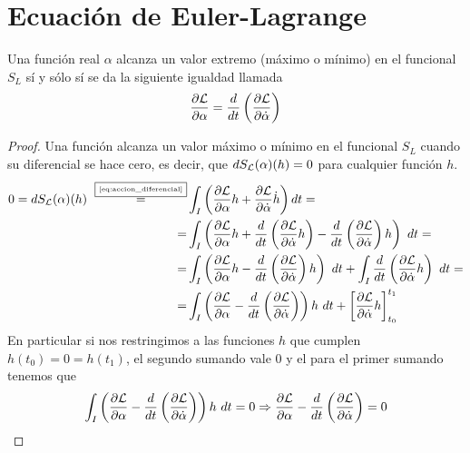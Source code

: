 \section{Ecuación de Euler-Lagrange}\label{sec:ecuacion-de-euler-lagrange}

\begin{theorem}
	Una función real $\alpha$ alcanza un valor extremo (máximo o mínimo) en el funcional $S_L$ sí y sólo sí se da la siguiente igualdad llamada 
	\begin{equation}
		\label{eq:euler-lagrange}
		\frac{\partial \mathcal{L}}{\partial \alpha}=\frac{d}{dt}\left( \frac{\partial \mathcal{L}}{\partial \dot{\alpha}} \right)
	\end{equation}
\end{theorem}
\begin{proof}
	Una función alcanza un valor máximo o mínimo en el funcional $S_L$ cuando su diferencial se hace cero, es decir, que $dS_{\mathcal{L}}(\alpha)(h)=0$ para cualquier función $h$.
	\begin{equation*}
		\begin{split}
			0 = dS_{\mathcal{L}}(\alpha)(h)~\overset{\fbox{\tiny \ref{eq:accion_diferencial}}}{=}&\int_{I}\left( \frac{\partial \mathcal{L}}{\partial\alpha}h+\frac{\partial \mathcal{L}}{\partial\dot{\alpha}}\dot{h}\right) dt =\\
			= & \int_{I}\left( \frac{\partial \mathcal{L}}{\partial\alpha}h+\frac{d}{dt}\left( \frac{\partial \mathcal{L}}{\partial \dot{\alpha}}h \right)-\frac{d}{dt}\left( \frac{\partial \mathcal{L}}{\partial \dot{\alpha}} \right)h\right)\ dt = \\
			= & \int_{I}\left( \frac{\partial \mathcal{L}}{\partial \alpha}h-\frac{d}{dt}\left( \frac{\partial \mathcal{L}}{\partial \dot{\alpha}} \right)h\right)\ dt +\int_{I}\frac{d}{dt}\left( \frac{\partial \mathcal{L}}{\partial \dot{\alpha}}h \right)\ dt = \\
			= & \int_I\left( \frac{\partial \mathcal{L}}{\partial \alpha}-\frac{d}{dt}\left( \frac{\partial \mathcal{L}}{\partial \dot{\alpha}} \right)\right)h\ dt + \left[ \frac{\partial \mathcal{L}}{\partial \dot{\alpha}}h \right]_{t_0}^{t_1}
		\end{split}
	\end{equation*}
	En particular si nos restringimos a las funciones $h$ que cumplen $h(t_0)=0=h(t_1)$, el segundo sumando vale $0$ y el para el primer sumando tenemos que
	\begin{equation*}
		\int_{I}\left( \frac{\partial \mathcal{L}}{\partial \alpha}-\frac{d}{dt}\left( \frac{\partial \mathcal{L}}{\partial \dot{\alpha}} \right)\right)h\ dt = 0 \Rightarrow \frac{\partial \mathcal{L}}{\partial \alpha}-\frac{d}{dt}\left( \frac{\partial \mathcal{L}}{\partial \dot{\alpha}} \right) = 0
	\end{equation*}
\end{proof}

